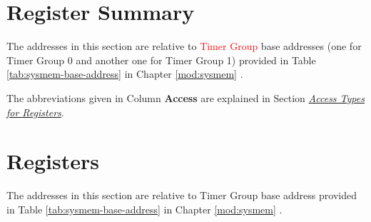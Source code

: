 \documentclass[main\_\_EN.tex]{subfiles}
\begin{document}

\clearpage
\section{Register Summary}
\label{sec:timg-reg-summ}
\hypertarget{timg-reg-summ}{}

The addresses in this section are relative to \textcolor{red}{Timer Group} base addresses (one for Timer Group 0 and another one for Timer Group 1) provided in Table \ref{tab:sysmem-base-address} in Chapter \ref{mod:sysmem} \textit{}.

The abbreviations given in Column \textbf{Access} are explained in Section \hyperref[glossary-access-types]{\textit{Access Types for Registers}}.





\clearpage
\section{Registers}

The addresses in this section are relative to Timer Group base address provided in Table \ref{tab:sysmem-base-address} in Chapter \ref{mod:sysmem} \textit{}.


\end{document}
